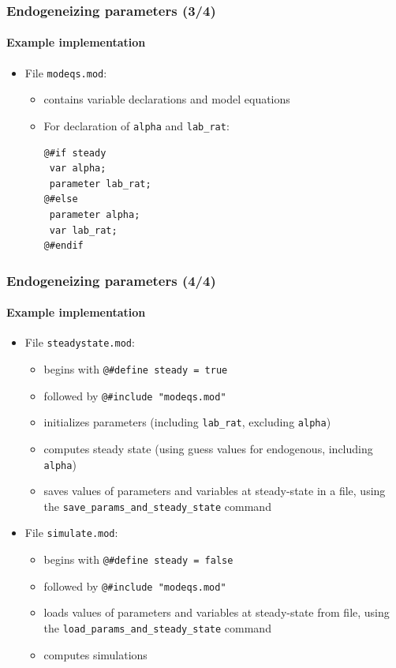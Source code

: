 \documentclass[aspectratio=169]{beamer}
\begin{document}
\begin{frame}[fragile=singleslide]
  \frametitle{Endogeneizing parameters (3/4)}
  \framesubtitle{Example implementation}
  \begin{itemize}
  \item File \texttt{modeqs.mod}:
    \begin{itemize}
    \item contains variable declarations and model equations
    \item For declaration of \texttt{alpha} and \texttt{lab\_rat}:
    \footnotesize
\begin{verbatim}
@#if steady
 var alpha;
 parameter lab_rat;
@#else
 parameter alpha;
 var lab_rat;
@#endif
\end{verbatim}
    \normalsize
    \end{itemize}

  \end{itemize}
\end{frame}

\begin{frame}[fragile=singleslide]
  \frametitle{Endogeneizing parameters (4/4)}
  \framesubtitle{Example implementation}
  \begin{itemize}
  \item File \texttt{steadystate.mod}:
    \begin{itemize}
    \item begins with \verb+@#define steady = true+
    \item followed by \verb+@#include "modeqs.mod"+
    \item initializes parameters (including \texttt{lab\_rat}, excluding \texttt{alpha})
    \item computes steady state (using guess values for endogenous, including \texttt{alpha})
    \item saves values of parameters and variables at steady-state in a file, using the \texttt{save\_params\_and\_steady\_state} command
    \end{itemize}
  \item File \texttt{simulate.mod}:
    \begin{itemize}
    \item begins with \verb+@#define steady = false+
    \item followed by \verb+@#include "modeqs.mod"+
    \item loads values of parameters and variables at steady-state from file, using the \texttt{load\_params\_and\_steady\_state} command
    \item computes simulations
    \end{itemize}
  \end{itemize}
\end{frame}
\end{document}
